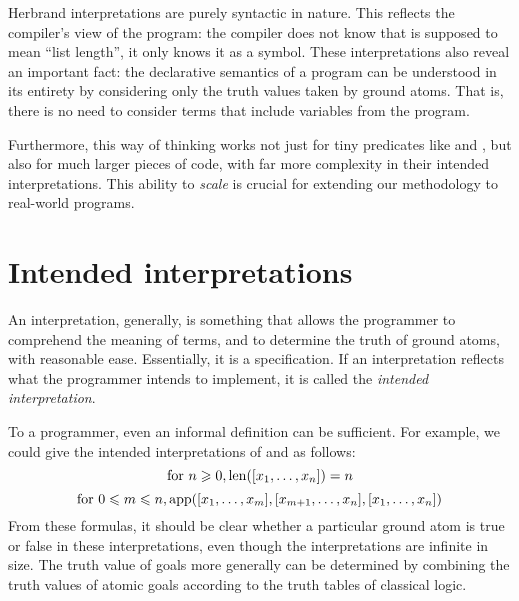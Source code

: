 Herbrand interpretations are purely syntactic in nature.
This reflects the compiler's view of the program:
the compiler does not know that 
is supposed to mean ``list length'',
it only knows it as a symbol.
These interpretations also reveal an important fact:
the declarative semantics of a program
can be understood in its entirety
by considering only the truth values taken by ground atoms.
That is, there is no need to consider terms that include
variables from the program.

Furthermore,
this way of thinking works not just for tiny predicates
like  and ,
but also for much larger pieces of code,
with far more complexity in their intended interpretations.
This ability to \emph{scale} is crucial for
extending our methodology to real-world programs.


\section{Intended interpretations}
\label{sec:intended-interp}

An interpretation\label{gi:interpretation}, generally,
is something that allows the programmer
to comprehend the meaning of terms,
and to determine the truth of ground atoms,
with reasonable ease.
Essentially, it is a specification.
If an interpretation reflects what the programmer intends to implement,
it is called the
\emph{intended interpretation\label{gi:intended-interpretation}}.

To a programmer, even an informal definition can be sufficient.
For example, we could give the intended interpretations
of  and  as follows:
\[
\text{for } n \geqslant 0, \operatorname{len}([x_1, \ldots, x_n]) = n
\]
\[
\text{for } 0 \leqslant m \leqslant n,
\operatorname{app}([x_1, \ldots, x_m], [x_{m+1}, \ldots, x_n], [x_1, \ldots, x_n])
\]
From these formulas,
it should be clear whether a particular ground atom
is true or false in these interpretations,
even though the interpretations are infinite in size.
The truth value of goals more generally
can be determined by combining the truth values of atomic goals
according to the truth tables of classical logic.

